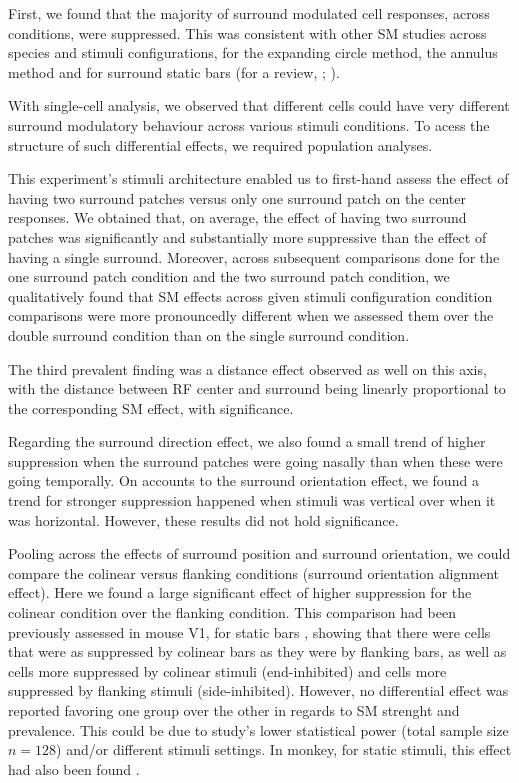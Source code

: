 First, we found that the majority of surround modulated cell responses, across conditions, were suppressed. This was consistent with other SM studies across species and stimuli configurations, for the expanding circle method, the annulus method and for surround static bars (for a review, \cite{Angelucci2017}; \cite{Samonds2017}). 

With single-cell analysis, we observed that different cells could have very different surround modulatory behaviour across various stimuli conditions. To acess the structure of such differential effects, we required population analyses.

This experiment's stimuli architecture enabled us to first-hand assess the effect of having two surround patches versus only one surround patch on the center responses. We obtained that, on average, the effect of having two surround patches was significantly and substantially more suppressive than the effect of having a single surround. Moreover, across subsequent comparisons done for the one surround patch condition and the two surround patch condition, we qualitatively found that SM effects across given stimuli configuration condition comparisons were more pronouncedly different when we assessed them over the double surround condition than on the single surround condition.

The third prevalent finding was a distance effect observed as well on this axis, with the distance between RF center and surround being linearly proportional to the corresponding SM effect, with significance.

Regarding the surround direction effect, we also found a small trend of higher suppression when the surround patches were going nasally than when these were going temporally. On accounts to the surround orientation effect, we found a trend for stronger suppression happened when stimuli was vertical over when it was horizontal. However, these results did not hold significance.

Pooling across the effects of surround position and surround orientation, we could compare the colinear versus flanking conditions (surround orientation alignment effect). Here we found a large significant effect of higher suppression for the colinear condition over the flanking condition. This comparison had been previously assessed in mouse V1, for static bars \cite{Samonds2017}, showing that there were cells that were as suppressed by colinear bars as they were by flanking bars, as well as cells more suppressed by colinear stimuli (end-inhibited) and cells more suppressed by flanking stimuli (side-inhibited). However, no differential effect was reported favoring one group over the other in regards to SM strenght and prevalence. This could be due to \cite{Samonds2017} study's lower statistical power (total sample size $n=128$) and/or different stimuli settings. In monkey, for static stimuli, this effect had also been found \cite{Cavanaugh2002a}.

